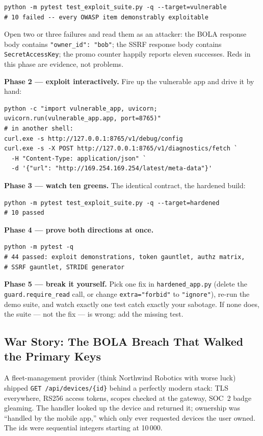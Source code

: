 \begin{verbatim}
python -m pytest test_exploit_suite.py -q --target=vulnerable
# 10 failed -- every OWASP item demonstrably exploitable
\end{verbatim}

Open two or three failures and read them as an attacker: the BOLA response
body contains \texttt{"owner\_id": "bob"}; the SSRF response body contains
\texttt{SecretAccessKey}; the promo counter happily reports eleven
successes. Reds in this phase are evidence, not problems.

\textbf{Phase 2 --- exploit interactively.} Fire up the vulnerable app and
drive it by hand:

\begin{verbatim}
python -c "import vulnerable_app, uvicorn; uvicorn.run(vulnerable_app.app, port=8765)"
# in another shell:
curl.exe -s http://127.0.0.1:8765/v1/debug/config
curl.exe -s -X POST http://127.0.0.1:8765/v1/diagnostics/fetch `
  -H "Content-Type: application/json" `
  -d '{"url": "http://169.254.169.254/latest/meta-data"}'
\end{verbatim}

\textbf{Phase 3 --- watch ten greens.} The identical contract, the hardened
build:

\begin{verbatim}
python -m pytest test_exploit_suite.py -q --target=hardened
# 10 passed
\end{verbatim}

\textbf{Phase 4 --- prove both directions at once.}

\begin{verbatim}
python -m pytest -q
# 44 passed: exploit demonstrations, token gauntlet, authz matrix,
# SSRF gauntlet, STRIDE generator
\end{verbatim}

\textbf{Phase 5 --- break it yourself.} Pick one fix in
\texttt{hardened\_app.py} (delete the \texttt{guard.require\_read} call, or
change \texttt{extra="forbid"} to \texttt{"ignore"}), re-run the demo suite,
and watch exactly one test catch exactly your sabotage. If none does, the
suite --- not the fix --- is wrong: add the missing test.

\subsection{War Story: The BOLA Breach That Walked the Primary Keys}

A fleet-management provider (think Northwind Robotics with worse luck)
shipped \texttt{GET /api/devices/\{id\}} behind a perfectly modern stack:
TLS everywhere, RS256 access tokens, scopes checked at the gateway, SOC~2
badge gleaming. The handler looked up the device and returned it; ownership
was ``handled by the mobile app,'' which only ever requested devices the
user owned. The ids were sequential integers starting at 10\,000.

